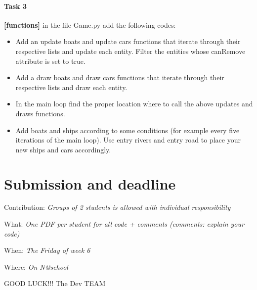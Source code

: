 \documentclass[10pt,a4paper]{article}
\begin{document}
\paragraph{Task 3} \textbf{[functions]} in the file Game.py add the following codes:
  \begin{itemize}
  	\item Add an update boats and update cars functions that iterate through their respective lists and update each entity. Filter the entities whose canRemove attribute is set to true.
  	\item Add a draw boats and draw cars functions that iterate through their respective lists and draw each entity.
  	\item In the main loop find the proper location where to call the above updates and draws functions.
  	\item Add boats and ships according to some conditions (for example every five iterations of the main loop). Use entry rivers and entry road to place your new ships and cars accordingly. 
  \end{itemize}

\section{Submission and deadline}

\noindent
Contribution: \textit{Groups of 2 students is allowed with individual responsibility}

\noindent
What: \textit{One PDF per student for all code + comments (comments: explain your code)}

\noindent
When: \textit{The Friday of week 6}

\noindent
Where: \textit{On N@school}


\huge
\centering
GOOD LUCK!!! The Dev TEAM \smiley

	
\end{document}
